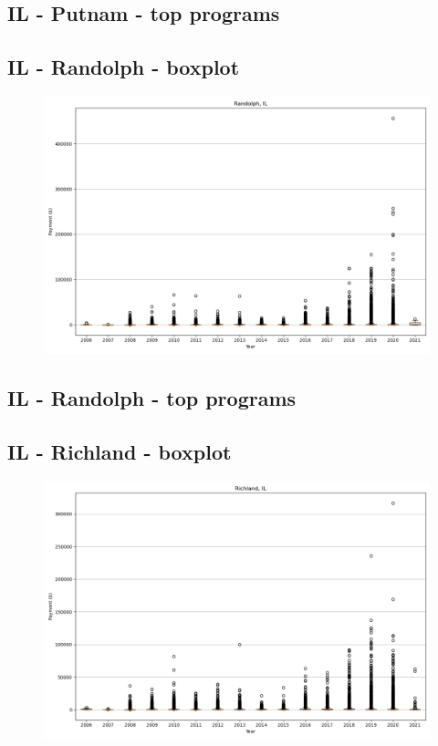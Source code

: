 \subsection*{IL - Putnam - top programs}

\newpage
\subsection*{IL - Randolph - boxplot}
\begin{figure}[h]
\centering
\includegraphics[width=7in]{../output/boxplots/counties/Randolph-IL_boxplot.png}
\end{figure}


\subsection*{IL - Randolph - top programs}

\newpage
\subsection*{IL - Richland - boxplot}
\begin{figure}[h]
\centering
\includegraphics[width=7in]{../output/boxplots/counties/Richland-IL_boxplot.png}
\end{figure}


